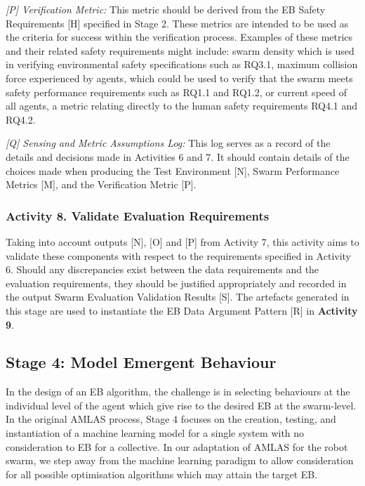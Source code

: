 \documentclass[runningheads]{llncs}
\begin{document}
\emph{[P] Verification Metric:} This metric should be derived from the EB Safety Requirements [H] specified in Stage 2. These metrics are intended to be used as the criteria for success within the verification process. Examples of these metrics and their related safety requirements might include: swarm density which is used in verifying environmental safety specifications such as RQ3.1, maximum collision force experienced by agents, which could be used to verify that the swarm meets safety performance requirements such as RQ1.1 and RQ1.2, or current speed of all agents, a metric relating directly to the human safety requirements RQ4.1 and RQ4.2.

\emph{[Q] Sensing and Metric Assumptions Log:} This log serves as a record of the details and decisions made in Activities 6 and 7. It should contain details of the choices made when producing the Test Environment [N], Swarm Performance Metrics [M], and the Verification Metric [P].
\subsubsection*{Activity 8. Validate Evaluation Requirements}

Taking into account outputs [N], [O] and [P] from Activity 7, this activity aims to validate these components with respect to the requirements specified in Activity 6. Should any discrepancies exist between the data requirements and the evaluation requirements, they should be justified appropriately and recorded in the output Swarm Evaluation Validation Results [S]. 
The artefacts generated in this stage are used to instantiate the EB Data Argument Pattern [R] in \textbf{Activity 9}.

\subsection{Stage 4: Model Emergent Behaviour} \label{framework-stage4}
In the design of an EB algorithm, the challenge is in selecting behaviours at the individual level of the agent which give rise to the desired EB at the swarm-level. 
In the original AMLAS process, Stage 4 focuses on the creation, testing, and instantiation of a machine learning model for a single system with no consideration to EB for a collective. 
In our adaptation of AMLAS for the robot swarm,  we step away from the machine learning paradigm to allow consideration for all possible optimisation algorithms which may attain the target EB.
\end{document}
